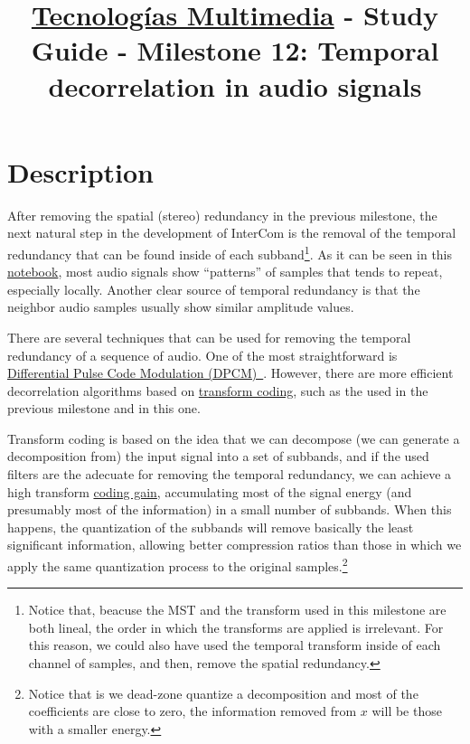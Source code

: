 \title{\href{https://www.ual.es/estudios/grados/presentacion/plandeestudios/asignatura/4015/40154321?idioma=zh_CN}{Tecnologías Multimedia} - Study Guide - Milestone 12: Temporal decorrelation in audio signals}

\maketitle

\section{Description}

After removing the spatial (stereo) redundancy in the previous
milestone, the next natural step in the development of InterCom is the
removal of the temporal redundancy that can be found inside of each
subband\footnote{Notice that, beacuse the MST and the transform used
in this milestone are both lineal, the order in which the transforms
are applied is irrelevant. For this reason, we could also have used
the temporal transform inside of each channel of samples, and then,
remove the spatial redundancy.}. As it can be seen in this
\href{}{notebook}, most audio signals show ``patterns'' of samples
that tends to repeat, especially locally. Another clear source of
temporal redundancy is that the neighbor audio samples usually show
similar amplitude values.

There are several techniques that can be used for removing the
temporal redundancy of a sequence of audio. One of the most
straightforward is
\href{https://en.wikipedia.org/wiki/Differential_pulse-code_modulation}{Differential
  Pulse Code Modulation
  (DPCM)~\cite{sayood2017introduction}}. However, there are more
efficient decorrelation algorithms based on
\href{https://en.wikipedia.org/wiki/Transform_coding}{transform
  coding}, such as the used in the previous milestone and in this one.

Transform coding is based on the idea that we can decompose (we can
generate a decomposition from) the input signal into a set of
subbands, and if the used filters are the adecuate for removing the
temporal redundancy, we can achieve a high
transform \href{https://en.wikipedia.org/wiki/Coding_gain}{coding
gain}, accumulating most of the signal energy (and presumably most of
the information) in a small number of subbands. When this happens, the
quantization of the subbands will remove basically the least
significant information, allowing better compression ratios than those
in which we apply the same quantization process to the original
samples.\footnote{Notice that is we dead-zone quantize a decomposition and most of the coefficients are close to zero, the information removed from $x$ will be those with a smaller energy.}

